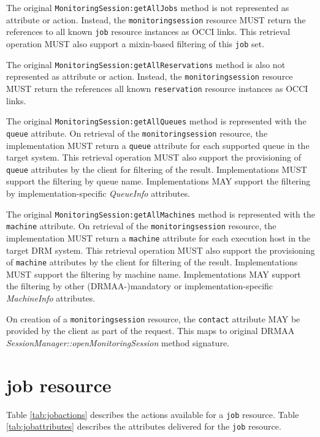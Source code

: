 \documentclass[10pt]{article}
\newcommand{\h}[1]{\lstinline|#1|}
\begin{document}
The original \h{MonitoringSession:getAllJobs} method is not represented as attribute or action. Instead, the \h{monitoringsession} resource MUST return the references to all known \h{job} resource instances as OCCI links. This retrieval operation MUST also support a mixin-based filtering of this \h{job} set. 

The original \h{MonitoringSession:getAllReservations} method is also not represented as attribute or action. Instead, the \h{monitoringsession} resource MUST return the references all known \h{reservation} resource instances as OCCI links. 

The original \h{MonitoringSession:getAllQueues} method is represented with the \h{queue} attribute. On retrieval of the \h{monitoringsession} resource, the implementation MUST return a \h{queue} attribute for each supported queue in the target system. This retrieval operation MUST also support the provisioning of \h{queue} attributes by the client for filtering of the result. Implementations MUST support the filtering by queue name. Implementations MAY support the filtering by implementation-specific \emph{QueueInfo} attributes.

The original \h{MonitoringSession:getAllMachines} method is represented with the \h{machine} attribute. On retrieval of the \h{monitoringsession} resource, the implementation MUST return a \h{machine} attribute for each execution host in the target DRM system. This retrieval operation MUST also support the provisioning of \h{machine} attributes by the client for filtering of the result. Implementations MUST support the filtering by machine name. Implementations MAY support the filtering by other (DRMAA-)mandatory or implementation-specific \emph{MachineInfo} attributes.

On creation of a \h{monitoringsession} resource, the \h{contact} attribute MAY be provided by the client as part of the request. This maps to original DRMAA \emph{SessionManager::openMonitoringSession} method signature.


\section{job resource}

Table \ref{tab:jobactions} describes the actions available for a \h{job} resource. Table \ref{tab:jobattributes} describes the attributes delivered for the \h{job} resource.
\end{document}
